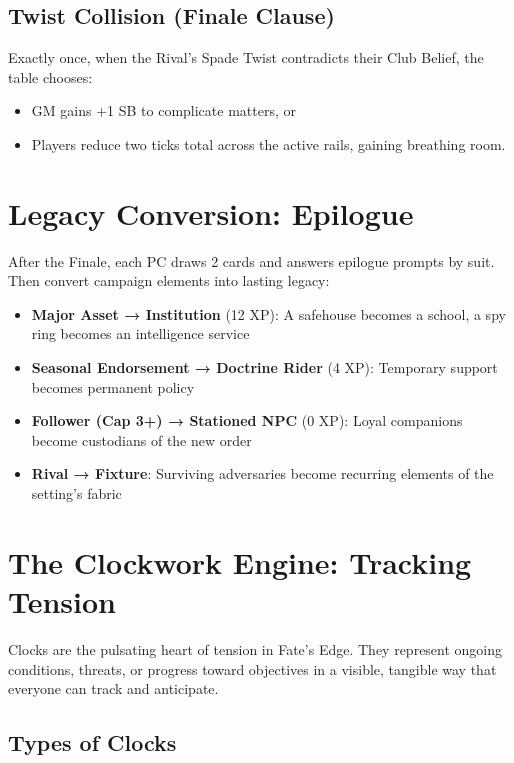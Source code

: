 \subsection*{Twist Collision (Finale Clause)}

Exactly once, when the Rival's Spade Twist contradicts their Club Belief, the table chooses:
\begin{itemize}
    \item GM gains +1 SB to complicate matters, or
    \item Players reduce two ticks total across the active rails, gaining breathing room.
\end{itemize}

\section*{Legacy Conversion: Epilogue}

After the Finale, each PC draws 2 cards and answers epilogue prompts by suit. Then convert campaign elements into lasting legacy:

\begin{itemize}
    \item \textbf{Major Asset → Institution} (12 XP): A safehouse becomes a school, a spy ring becomes an intelligence service
    \item \textbf{Seasonal Endorsement → Doctrine Rider} (4 XP): Temporary support becomes permanent policy
    \item \textbf{Follower (Cap 3+) → Stationed NPC} (0 XP): Loyal companions become custodians of the new order
    \item \textbf{Rival → Fixture}: Surviving adversaries become recurring elements of the setting's fabric
\end{itemize}

\section*{The Clockwork Engine: Tracking Tension}

Clocks are the pulsating heart of tension in Fate's Edge. They represent ongoing conditions, threats, or progress toward objectives in a visible, tangible way that everyone can track and anticipate.

\subsection*{Types of Clocks}

